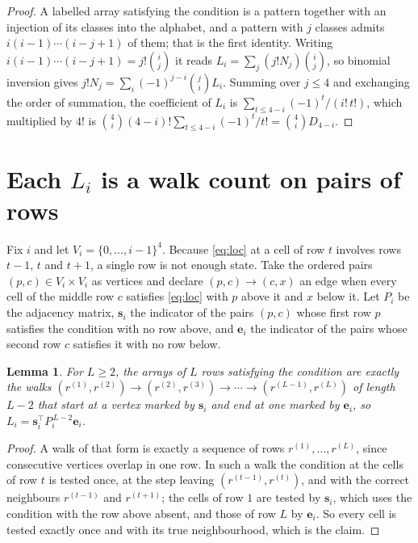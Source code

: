 \documentclass[11pt,a4paper]{article}
\theoremstyle{plain}
\newtheorem{lemma}[theorem]{Lemma}
\theoremstyle{definition}
\begin{document}
\begin{proof}
A labelled array satisfying the condition is a pattern together with an injection of its
classes into the alphabet, and a pattern with $j$ classes admits $i(i-1)\cdots(i-j+1)$ of
them; that is the first identity. Writing $i(i-1)\cdots(i-j+1)=j!\binom{i}{j}$ it reads
$L_i=\sum_j(j!N_j)\binom{i}{j}$, so binomial inversion gives
$j!N_j=\sum_i(-1)^{j-i}\binom{j}{i}L_i$. Summing over $j\le4$ and exchanging the
order of summation, the coefficient of $L_i$ is
$\sum_{t\le4-i}(-1)^t/(i!\,t!)$, which multiplied by $4!$ is
$\binom{4}{i}(4-i)!\sum_{t\le4-i}(-1)^t/t!=\binom{4}{i}D_{4-i}$.
\end{proof}

\section{Each $L_i$ is a walk count on pairs of rows}

Fix $i$ and let $V_i=\{0,\dots,i-1\}^{4}$. Because \eqref{eq:loc} at a cell of row
$t$ involves rows $t-1$, $t$ and $t+1$, a single row is not enough state. Take the
ordered pairs $(p,c)\in V_i\times V_i$ as vertices and declare $(p,c)\to(c,x)$ an edge when
every cell of the middle row $c$ satisfies \eqref{eq:loc} with $p$ above it and $x$
below it. Let $P_i$ be the adjacency matrix, $\mathbf{s}_i$ the indicator of the pairs
$(p,c)$ whose first row $p$ satisfies the condition with no row above, and
$\mathbf{e}_i$ the indicator of the pairs whose second row $c$ satisfies it with no
row below.

\begin{lemma}\label{lem:walk}
For $L\ge2$, the arrays of $L$ rows satisfying the condition are exactly the walks
$(r^{(1)},r^{(2)})\to(r^{(2)},r^{(3)})\to\cdots\to(r^{(L-1)},r^{(L)})$ of length
$L-2$ that start at a vertex marked by $\mathbf{s}_i$ and end at one marked by
$\mathbf{e}_i$, so
$L_i=\mathbf{s}_i^{\!\top}P_i^{\,L-2}\mathbf{e}_i$.
\end{lemma}

\begin{proof}
A walk of that form is exactly a sequence of rows $r^{(1)},\dots,r^{(L)}$, since
consecutive vertices overlap in one row. In such a walk the condition at the cells of
row $t$ is tested once, at the step leaving $(r^{(t-1)},r^{(t)})$, and with the
correct neighbours $r^{(t-1)}$ and $r^{(t+1)}$; the cells of row $1$ are tested by
$\mathbf{s}_i$, which uses the condition with the row above absent, and those of row
$L$ by $\mathbf{e}_i$. So every cell is tested exactly once and with its true
neighbourhood, which is the claim.
\end{proof}
\end{document}
